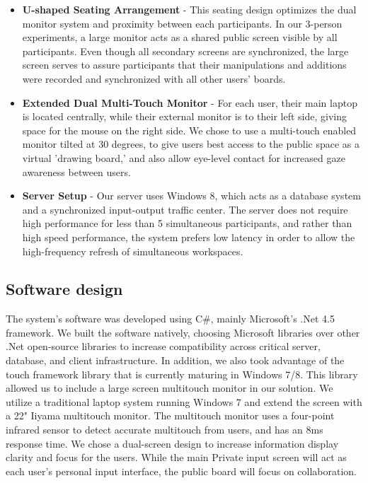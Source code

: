 \documentclass{sigchi}
\begin{document}
\begin{itemize}

\item \textbf{U-shaped Seating Arrangement} - This seating design optimizes the dual monitor system and proximity between each participants. In our 3-person experiments, a large monitor acts as a shared public screen visible by all participants. Even though all secondary screens are synchronized, the large screen serves to assure participants that their manipulations and additions were recorded and synchronized with all other users' boards. 
\item \textbf{Extended Dual Multi-Touch Monitor} - For each user, their main laptop is located centrally, while their external monitor is to their left side, giving space for the mouse on the right side. We chose to use a multi-touch enabled monitor tilted at 30 degrees, to give users best access to the public space as a virtual 'drawing board,' and also allow eye-level contact for increased gaze awareness between users. 
\item \textbf{Server Setup} - Our server uses Windows 8, which acts as a database system and a synchronized input-output traffic center. The server does not require high performance for less than 5 simultaneous participants, and rather than high speed performance, the system prefers low latency in order to allow the high-frequency refresh of simultaneous workspaces.
\end{itemize}



\subsection{Software design}


The system's software was developed using C\#, mainly Microsoft's .Net 4.5  framework. We built the software natively, choosing Microsoft libraries over other .Net open-source libraries to increase compatibility across critical server, database, and client infrastructure. In addition, we also took advantage of the touch framework library that is currently maturing in Windows 7/8. This library allowed us to include a large screen multitouch monitor in our solution. We utilize a traditional laptop system running Windows 7 and extend the screen with a 22" Iiyama multitouch monitor. The multitouch monitor uses a four-point infrared sensor to detect accurate multitouch from users, and has an 8ms response time. We chose a dual-screen design to increase information display clarity and focus for the users. While the main Private input screen will act as each user's personal input interface,  the public board will focus on collaboration. 
\end{document}
